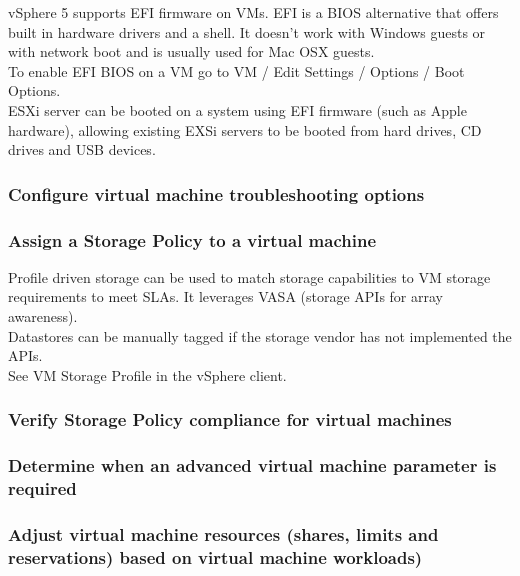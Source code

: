 vSphere 5 supports EFI firmware on VMs. EFI is a BIOS alternative that offers
built in hardware drivers and a shell. It doesn't work with Windows guests
or with network boot and is usually used for Mac OSX guests.\\

To enable EFI BIOS on a VM go to VM / Edit Settings / Options / Boot Options.\\

ESXi server can be booted on a system using EFI firmware (such as Apple
hardware), allowing existing EXSi servers to be booted from hard drives, CD
drives and USB devices.

\subsubsection{Configure virtual machine troubleshooting options}

\subsubsection{Assign a Storage Policy to a virtual machine}

Profile driven storage can be used to match storage capabilities to VM storage
requirements to meet SLAs. It leverages VASA (storage APIs for array
awareness).\\

Datastores can be manually tagged if the storage vendor has not implemented
the APIs.\\

See VM Storage Profile in the vSphere client.

\subsubsection{Verify Storage Policy compliance for virtual machines}

\subsubsection{Determine when an advanced virtual machine parameter is required}

\subsubsection{Adjust virtual machine resources (shares, limits and reservations) based on virtual machine workloads)}
